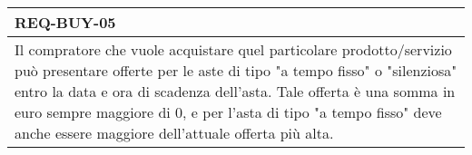                 \begin{tabular}{|p{}|}
                    \hline
                    \multicolumn{1}{|l|}{\cellcolor{head}\textbf{REQ-BUY-05}} \\
                    \hline
                    Il compratore che vuole acquistare quel particolare prodotto/servizio può presentare offerte per le aste di tipo "a tempo fisso" o "silenziosa" entro la data e ora di scadenza dell'asta. Tale offerta è una somma in euro sempre maggiore di 0, e per l'asta di tipo "a tempo fisso" deve anche essere maggiore dell'attuale offerta più alta.  \\
                    \hline
                \end{tabular} \smallskip \\
            
